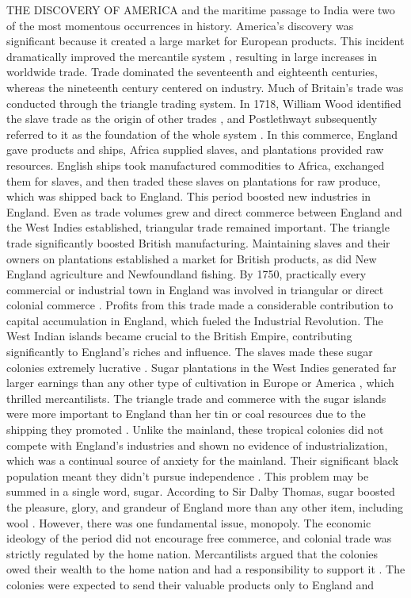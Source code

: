 THE DISCOVERY OF AMERICA and the maritime passage to India were two of the most momentous occurrences in history. America's discovery was significant because it created a large market for European products. This incident dramatically improved the mercantile system , resulting in large increases in worldwide trade. Trade dominated the seventeenth and eighteenth centuries, whereas the nineteenth century centered on industry. Much of Britain's trade was conducted through the triangle trading system. In 1718, William Wood identified the slave trade as the origin of other trades , and Postlethwayt subsequently referred to it as the foundation of the whole system . In this commerce, England gave products and ships, Africa supplied slaves, and plantations provided raw resources. English ships took manufactured commodities to Africa, exchanged them for slaves, and then traded these slaves on plantations for raw produce, which was shipped back to England. This period boosted new industries in England. Even as trade volumes grew and direct commerce between England and the West Indies established, triangular trade remained important. The triangle trade significantly boosted British manufacturing. Maintaining slaves and their owners on plantations established a market for British products, as did New England agriculture and Newfoundland fishing. By 1750, practically every commercial or industrial town in England was involved in triangular or direct colonial commerce . Profits from this trade made a considerable contribution to capital accumulation in England, which fueled the Industrial Revolution. The West Indian islands became crucial to the British Empire, contributing significantly to England's riches and influence. The slaves made these sugar colonies extremely lucrative . Sugar plantations in the West Indies generated far larger earnings than any other type of cultivation in Europe or America , which thrilled mercantilists. The triangle trade and commerce with the sugar islands were more important to England than her tin or coal resources due to the shipping they promoted . Unlike the mainland, these tropical colonies did not compete with England's industries and shown no evidence of industrialization, which was a continual source of anxiety for the mainland. Their significant black population meant they didn't pursue independence . This problem may be summed in a single word, sugar. According to Sir Dalby Thomas, sugar boosted the pleasure, glory, and grandeur of England more than any other item, including wool . However, there was one fundamental issue, monopoly. The economic ideology of the period did not encourage free commerce, and colonial trade was strictly regulated by the home nation. Mercantilists argued that the colonies owed their wealth to the home nation and had a responsibility to support it . The colonies were expected to send their valuable products only to England and 